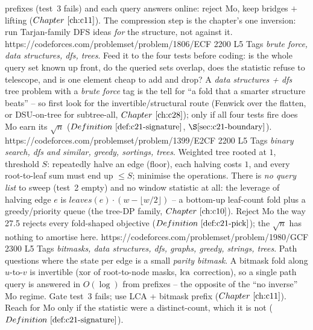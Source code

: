 \begin{mixedset}
{     prefixes (test~3 fails) and each query answers online: reject Mo, keep bridges
     \(+\) lifting (\(\chref{c11}\)). The compression step is the chapter's one
     inversion: run Tarjan-family DFS ideas \emph{for} the structure, not against it.}
    {https://codeforces.com/problemset/problem/1806/E}{CF 2200 L5}
    {Tags \emph{brute force, data structures, dfs, trees}. Feed it to the four tests
     before coding: is the whole query set known up front, do the queried sets overlap,
     does the statistic refuse to telescope, and is one element cheap to add and drop?
     A \emph{data structures + dfs} tree problem with a \emph{brute force} tag is the
     tell for ``a fold that a smarter structure beats'' -- so first look for the
     invertible/structural route (Fenwick over the flatten, or DSU-on-tree for
     subtree-all, \(\chref{c28}\)); only if all four tests fire does Mo earn its
     \(\sqrt n\) (\(\defref{c21-signature}\), \(\secref{c21-boundary}\)).}
    {https://codeforces.com/problemset/problem/1399/E2}{CF 2200 L5}
    {Tags \emph{binary search, dfs and similar, greedy, sortings, trees}. Weighted
     tree rooted at \(1\), threshold \(S\): repeatedly halve an edge (floor), each
     halving costs \(1\), and every root-to-leaf sum must end up \(\le S\); minimise
     the operations. There is \emph{no query list} to sweep (test~2 empty) and no
     window statistic at all: the leverage of halving edge \(e\) is
     \(\mathit{leaves}(e)\cdot(w-\lfloor w/2\rfloor)\) -- a bottom-up leaf-count
     fold plus a greedy/priority queue (the tree-DP family, \(\chref{c10}\)).
     Reject Mo the way 27.5 rejects every fold-shaped objective
     (\(\defref{c21-pick}\)); the \(\sqrt n\) has nothing to amortise here.}
    {https://codeforces.com/problemset/problem/1980/G}{CF 2300 L5}
    {Tags \emph{bitmasks, data structures, dfs, graphs, greedy, strings, trees}. Path
     questions where the state per edge is a small \emph{parity bitmask}. A bitmask fold
     along \(u\)-to-\(v\) is invertible (xor of root-to-node masks, \(\operatorname{lca}\) correction),
     so a single path query is answered in \(O(\log)\) from prefixes -- the opposite of
     the ``no inverse'' Mo regime. Gate test~3 fails; use LCA + bitmask prefix
     (\(\chref{c11}\)). Reach for Mo only if the statistic were a distinct-count, which
     it is not (\(\defref{c21-signature}\)).}
\end{mixedset}


